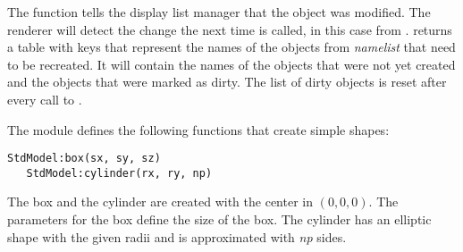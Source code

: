 The function  tells the display list manager that the object
was modified. The renderer will detect the change the next time
 is called, in this case from .
 returns a table with keys that represent the names of
the objects from {\em namelist} that need to be recreated. It will contain the
names of the objects that were not yet created and the objects that were marked
as dirty. The list of dirty objects is reset after every call to
.

The module  defines the following functions that create simple shapes:

\begin{Verbatim}[fontsize=\scriptsize,gobble=3]
   StdModel:box(sx, sy, sz)
   StdModel:cylinder(rx, ry, np)
\end{Verbatim}

The box and the cylinder are created with the center in $(0, 0, 0)$. The
parameters for the box define the size of the box. The cylinder has an elliptic
shape with the given radii and is approximated with {\em np} sides.


